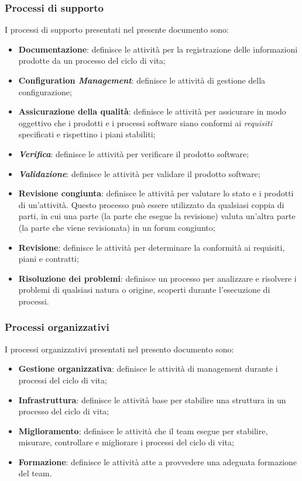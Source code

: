 \documentclass[10pt, a4paper]{article}
\begin{document}
\subsubsection{Processi di supporto}
I processi di supporto presentati nel presente documento sono:
\begin{itemize}
    \item \textbf{Documentazione}: definisce le attività per la registrazione delle informazioni prodotte da un processo del ciclo di vita;
    \item \textbf{Configuration \textit{Management\pg}}: definisce le attività di gestione della configurazione;
    \item \textbf{Assicurazione della qualità}: definisce le attività per assicurare in modo oggettivo che i prodotti e i processi software
    siano conformi ai \textit{requisiti\pg} specificati e rispettino i piani stabiliti;
    \item \textbf{\textit{Verifica\pg}}: definisce le attività per verificare il prodotto software;
    \item \textbf{\textit{Validazione\pg}}: definisce le attività per validare il prodotto software;
    \item \textbf{Revisione congiunta}: definisce le attività per valutare lo stato e i prodotti di un'attività. Questo processo può essere 
    utilizzato da qualsiasi coppia di parti, in cui una parte (la parte che esegue la revisione) valuta un'altra parte (la parte che viene revisionata)
    in un forum congiunto;
    \item \textbf{Revisione}: definisce le attività per determinare la conformità ai requisiti, piani e contratti;
    \item \textbf{Risoluzione dei problemi}: definisce un processo per analizzare e risolvere i problemi di qualsiasi natura o origine, scoperti
    durante l'esecuzione di processi.
\end{itemize}

\subsubsection{Processi organizzativi}
I processi organizzativi presentati nel presento documento sono:
\begin{itemize}
    \item \textbf{Gestione organizzativa}: definisce le attività di management durante i processi del ciclo di vita;
    \item \textbf{Infrastruttura}: definisce le attività base per stabilire una struttura in un processo del ciclo di vita;
    \item \textbf{Miglioramento}: definisce le attività che il team esegue per stabilire, misurare, controllare e migliorare i processi del ciclo di vita;
    \item \textbf{Formazione}: definisce le attività atte a provvedere una adeguata formazione del team.
\end{itemize}
\end{document}
